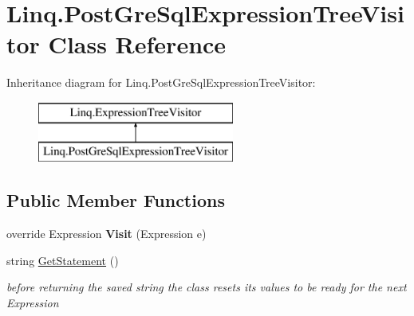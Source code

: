 \hypertarget{class_linq_1_1_post_gre_sql_expression_tree_visitor}{}\section{Linq.\+Post\+Gre\+Sql\+Expression\+Tree\+Visitor Class Reference}
\label{class_linq_1_1_post_gre_sql_expression_tree_visitor}
Inheritance diagram for Linq.\+Post\+Gre\+Sql\+Expression\+Tree\+Visitor\+:\begin{figure}[H]
\begin{center}
\leavevmode
\includegraphics[height=2.000000cm]{class_linq_1_1_post_gre_sql_expression_tree_visitor}
\end{center}
\end{figure}
\subsection*{Public Member Functions}
\begin{DoxyCompactItemize}
\item 
\mbox{\label{class_linq_1_1_post_gre_sql_expression_tree_visitor_ac89bd93ff590b05411d3637f78f4abd4}} 
override Expression {\bfseries Visit} (Expression e)
\item 
string \mbox{\hyperlink{class_linq_1_1_post_gre_sql_expression_tree_visitor_a0f8b065e5a69ee6f610cee03f7a3fc6d}{Get\+Statement}} ()
\begin{DoxyCompactList}\small\item\em before returning the saved string the class resets its values to be ready for the next Expression \end{DoxyCompactList}\end{DoxyCompactItemize}
